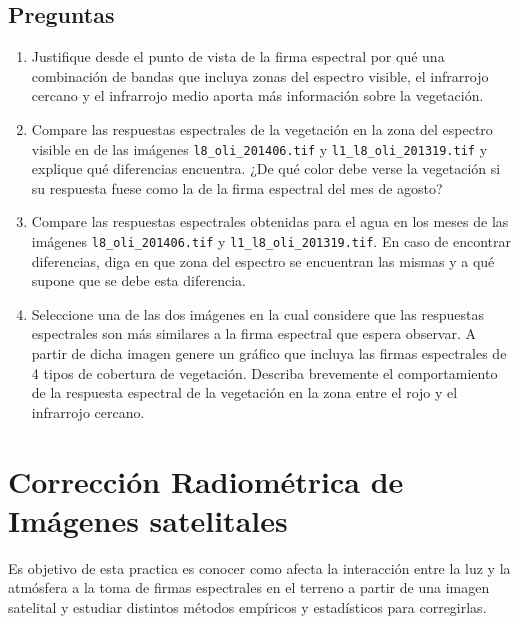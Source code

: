 \documentclass[hidelinks,12pt]{article}
\begin{document}
\subsection{Preguntas}
\begin{enumerate}
    \item Justifique desde el punto de vista de la firma espectral por qué una
        combinación de bandas que incluya zonas del espectro visible, el
        infrarrojo cercano y el infrarrojo medio aporta más información sobre la
        vegetación.
    \item Compare las respuestas espectrales de la vegetación en la zona del
        espectro visible en de las im\'agenes \texttt{l8\_oli\_2014\-06.tif}
        y \texttt{l1\_l8\_oli\_2013\-19.tif} y explique qué diferencias
        encuentra. ¿De qué color debe verse la vegetación si su respuesta fuese
        como la de la firma espectral del mes de agosto?
    \item Compare las respuestas espectrales obtenidas para el agua en los meses
        de las im\'agenes \texttt{l8\_oli\_2014\-06.tif}
        y \texttt{l1\_l8\_oli\_2013\-19.tif}. En caso de encontrar diferencias, 
        diga en que zona del espectro se encuentran las mismas y a qué supone que 
        se debe esta diferencia.
    \item Seleccione una de las dos imágenes en la cual considere que las
        respuestas espectrales son más similares a la firma espectral que espera
        observar. A partir de dicha imagen genere un gráfico que incluya las
        firmas espectrales de 4 tipos de cobertura de vegetación. Describa
        brevemente el comportamiento de la respuesta espectral de la vegetación
        en la zona entre el rojo y el infrarrojo cercano.
\end{enumerate}

\newpage
\section{Corrección Radiométrica de Imágenes satelitales}
Es objetivo de esta practica es conocer como afecta la interacción entre la luz
y la atmósfera a la toma de firmas espectrales en el terreno a partir de una
imagen satelital y estudiar distintos métodos empíricos y estadísticos para
corregirlas.
\end{document}
